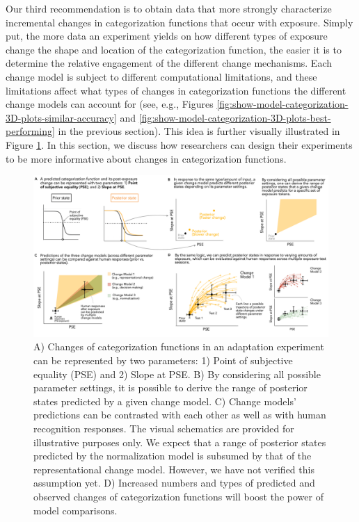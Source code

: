 \documentclass[
  11pt,
  english,
  man,floatsintext]{apa6}
\begin{document}
Our third recommendation is to obtain data that more strongly characterize incremental changes in categorization functions that occur with exposure. Simply put, the more data an experiment yields on how different types of exposure change the shape and location of the categorization function, the easier it is to determine the relative engagement of the different change mechanisms. Each change model is subject to different computational limitations, and these limitations affect what types of changes in categorization functions the different change models can account for (see, e.g., Figures \ref{fig:show-model-categorization-3D-plots-similar-accuracy} and \ref{fig:show-model-categorization-3D-plots-best-performing} in the previous section). This idea is further visually illustrated in Figure \ref{fig:constraints-on-change-models}. In this section, we discuss how researchers can design their experiments to be more informative about changes in categorization functions.

\begin{figure}[h]
\begin{center}
\includegraphics[width=1 \columnwidth]{../figures/diagrams/constraints-on-change-models.png}
\caption{A) Changes of categorization functions in an adaptation experiment can be represented by two parameters: 1) Point of subjective equality (PSE) and 2) Slope at PSE. B) By considering all possible parameter settings, it is possible to derive the range of posterior states predicted by a given change model. C) Change models’ predictions can be contrasted with each other as well as with human recognition responses. The visual schematics are provided for illustrative purposes only. We expect that a range of posterior states predicted by the normalization model is subsumed by that of the representational change model. However, we have not verified this assumption yet. D) Increased numbers and types of predicted and observed changes of categorization functions will boost the power of model comparisons.}\label{fig:constraints-on-change-models}
\end{center}
\end{figure}
\end{document}
